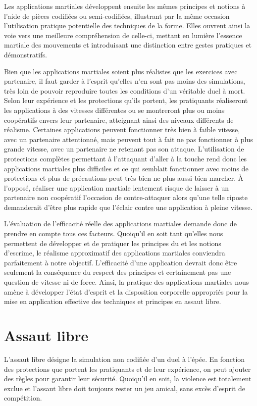 Les applications martiales développent ensuite les mêmes principes et notions à l'aide de pièces codifiées ou semi-codifiées, illustrant par la même occasion l'utilisation pratique potentielle des techniques de la forme.
Elles ouvrent ainsi la voie vers une meilleure compréhension de celle-ci, mettant en lumière l'essence martiale des mouvements et introduisant une distinction entre gestes pratiques et démonstratifs.

Bien que les applications martiales soient plus réalistes que les exercices avec partenaire, il faut garder à l'esprit qu'elles n'en sont pas moins des simulations, très loin de pouvoir reproduire toutes les conditions d'un véritable duel à mort.
Selon leur expérience et les protections qu'ils portent, les pratiquants réaliseront les applications à des vitesses différentes ou se montreront plus ou moins coopératifs envers leur partenaire, atteignant ainsi des niveaux différents de réalisme.
Certaines applications peuvent fonctionner très bien à faible vitesse, avec un partenaire attentionné,  mais peuvent tout à fait ne pas fonctionner à plus grande vitesse, avec un partenaire ne retenant pas son attaque.
L'utilisation de protections complètes permettant à l'attaquant d'aller à la touche rend donc les applications martiales plus difficiles et ce qui semblait fonctionner avec moins de protections et plus de précautions peut très bien ne plus aussi bien marcher.   
\`{A} l'opposé, réaliser une application martiale lentement risque de laisser à un partenaire non coopératif l'occasion de contre-attaquer alors qu'une telle riposte demanderait d'être plus rapide que l'éclair contre une application à pleine vitesse. 

L'évaluation de l'efficacité réelle des applications martiales demande donc de prendre en compte tous ces facteurs.
Quoiqu'il en soit tant qu'elles nous permettent de développer et de pratiquer les principes du \Taiji{} et les notions d'escrime, le réalisme approximatif des applications martiales conviendra parfaitement à notre objectif.
L'efficacité d'une application devrait donc être seulement la conséquence du respect des principes et certainement pas une question de vitesse ni de force.
Ainsi, la pratique des applications martiales nous amène à développer l'état d'esprit et la disposition corporelle appropriés pour la mise en application effective des techniques et principes en assaut libre.

\section{Assaut libre}
L'assaut libre désigne la simulation non codifiée d'un duel à l'épée.
En fonction des protections que portent les pratiquants et de leur expérience, on peut ajouter des règles pour garantir leur sécurité.
Quoiqu'il en soit, la violence est totalement exclue et l'assaut libre doit toujours rester un jeu amical, sans excès d'esprit de compétition.

